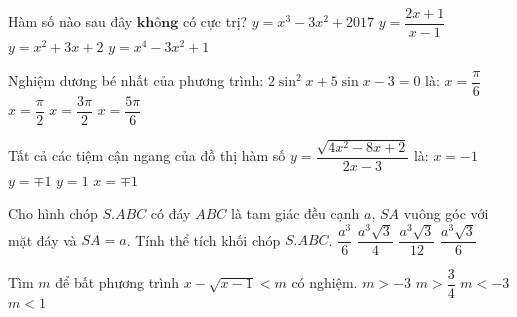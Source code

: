 \begin{ex}%
Hàm số nào sau đây $\textbf{không}$ có cực trị?
\choice
{$y=x^3-3x^2+2017$}
{\True $y=\dfrac{2x+1}{x-1}$}
{$y=x^2+3x+2$}
{$y=x^4-3x^2+1$}
\end{ex}
\begin{ex}%
Nghiệm dương bé nhất của phương trình: $2\sin ^2x+5\sin x-3=0$ là:
\choice
{\True $x=\dfrac{\pi}{6}$}
{$x=\dfrac{\pi}{2}$}
{$x=\dfrac{3\pi}{2}$}
{$x=\dfrac{5\pi}{6}$}
\end{ex}
\begin{ex}%
Tất cả các tiệm cận ngang của đồ thị hàm số $y=\dfrac{\sqrt{4x^2-8x+2}}{2x-3}$ là:
\choice
{$x=-1$}
{\True $y=\mp 1$}
{$y=1$}
{$x=\mp 1$}
\end{ex}
\begin{ex}%
Cho hình chóp $S.ABC$ có đáy $ABC$ là tam giác đều cạnh $a$, $SA$ vuông góc với mặt đáy và $SA=a$. Tính thể tích khối chóp $S.ABC$.
\choice
{$\dfrac{a^3}{6}$}
{$\dfrac{a^3\sqrt{3}}{4}$}
{\True $\dfrac{a^3\sqrt{3}}{12}$}
{$\dfrac{a^3\sqrt{3}}{6}$}
\end{ex}
\begin{ex}%
Tìm $m$ để bất phương trình $x-\sqrt{x-1}<m$ có nghiệm.
\choice
{$m>-3$}
{\True $m>\dfrac{3}{4}$}
{$m<-3$}
{$m<1$}
\end{ex}
